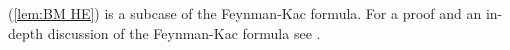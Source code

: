 \documentclass[a4paper,12pt]{article}
\begin{document}
\begin{related}
    (\ref{lem:BM HE}) is a subcase of the Feynman-Kac formula.
    For a proof and an in-depth discussion of the Feynman-Kac formula
    see \cite{oksendal_stochastic_2003}. \\
\end{related}


\newpage
\begin{abstract}
    
\end{abstract}

\printbibliography
\newpage
\end{document}
